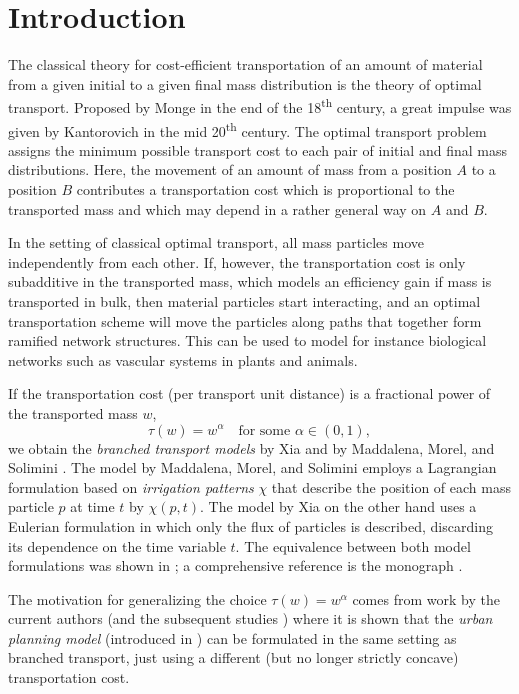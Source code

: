 \documentclass[10pt,a4paper,oneside,final]{article}
\numberwithin{equation}{section}
\theoremstyle{plain}
\theoremstyle{definition}
\theoremstyle{remark}
\begin{document}

\section{Introduction}
The classical theory for cost-efficient transportation of an amount of material from a given initial to a given final mass distribution is the theory of optimal transport.
Proposed by Monge in the end of the 18\textsuperscript{th} century, a great impulse was given by Kantorovich in the mid 20\textsuperscript{th} century.
The optimal transport problem assigns the minimum possible transport cost to each pair of initial and final mass distributions.
Here, the movement of an amount of mass from a position $A$ to a position $B$ contributes a transportation cost which is proportional to the transported mass and which may depend in a rather general way on $A$ and $B$.

In the setting of classical optimal transport, all mass particles move independently from each other.
If, however, the transportation cost is only subadditive in the transported mass, which models an efficiency gain if mass is transported in bulk,
then material particles start interacting, and an optimal transportation scheme will move the particles along paths that together form ramified network structures.
This can be used to model for instance biological networks such as vascular systems in plants and animals.

If the transportation cost (per transport unit distance) is a fractional power of the transported mass $w$,
\begin{equation*}
\tau(w)=w^\alpha\quad\text{for some }\alpha\in(0,1),
\end{equation*}
we obtain the \emph{branched transport models} by Xia \cite{Xia-Optimal-Paths} and by Maddalena, Morel, and Solimini \cite{Maddalena-Morel-Solimini-Irrigation-Patterns}.
The model by Maddalena, Morel, and Solimini employs a Lagrangian formulation based on \emph{irrigation patterns} $\chi$ that describe the position of each mass particle $p$ at time $t$ by $\chi(p,t)$.
The model by Xia on the other hand uses a Eulerian formulation in which only the flux of particles is described, discarding its dependence on the time variable $t$.
The equivalence between both model formulations was shown in \cite{Maddalena-Solimini-Transport-Distances,Maddalena-Solimini-Synchronic};
a comprehensive reference is the monograph \cite{BeCaMo09}.

The motivation for generalizing the choice $\tau(w)=w^\alpha$ comes from work by the current authors \cite{BrWi15-equivalent} (and the subsequent studies \cite{BrRoWi16,BrWi15-micropatterns}) where it is shown that the \emph{urban planning model} (introduced in \cite{Brancolini-Buttazzo}) can be formulated in the same setting as branched transport, just using a different (but no longer strictly concave) transportation cost.
\end{document}

